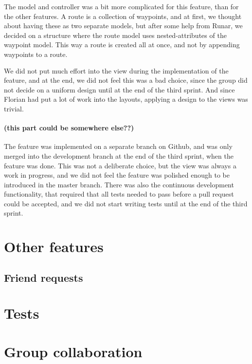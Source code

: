\documentclass[a4paper]{article}
\begin{document}
The model and controller was a bit more complicated for this feature, than for the other features. A route is a collection of waypoints, and at first, we thought about having these as two separate models,  but after some help from Runar, we decided on a structure where the route model uses nested-attributes of the waypoint model. This way a route is created all at once, and not by appending waypoints to a route. 

We did not put much effort into the view during the implementation of the feature, and at the end, we did not feel this was a bad choice, since the group did not decide on a uniform design until at the end of the third sprint. And since Florian had put a lot of work into the layouts, applying a design to the views was trivial.

\paragraph{(this part could be somewhere else??)}The feature was implemented on a separate branch on Github, and was only merged into the development branch at the end of the third sprint, when the feature was done. This was not a deliberate choice, but the view was always a work in progress, and we did not feel the feature was polished enough to be introduced in the master branch. There was also the continuous development functionality, that required that all tests needed to pass before a pull request could be accepted, and we did not start writing tests until at the end of the third sprint. 

\section{Other features}
\subsection{Friend requests}

\section{Tests}

\section{Group collaboration}
\end{document}
